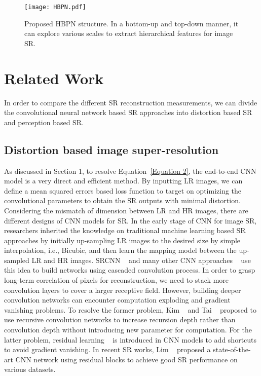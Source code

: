 \documentclass[10pt,twocolumn,letterpaper]{article}
\begin{document}
\begin{figure*}[h]
\vskip 0.01in
\begin{center}
\centerline{\texttt{[image: HBPN.pdf]}}
\caption{Proposed HBPN structure. In a bottom-up and top-down manner, it can explore various scales to extract hierarchical features for image SR.}
\label{Figure 1}
\end{center}
\vskip -0.3in
\end{figure*}


\section{Related Work}

In order to compare the different SR reconstruction measurements, we can divide the convolutional neural network based SR approaches into distortion based SR and perception based SR.

\subsection{Distortion based image super-resolution}

As discussed in Section 1, to resolve Equation~\ref{Equation 2}, the end-to-end CNN model is a very direct and efficient method. By inputting LR images, we can define a mean squared errors based loss function to target on optimizing the convolutional parameters to obtain the SR outputs with minimal distortion. Considering the mismatch of dimension between LR and HR images, there are different designs of CNN models for SR. In the early stage of CNN for image SR, researchers inherited the knowledge on traditional machine learning based SR approaches by initially up-sampling LR images to the desired size by simple interpolation, i.e., Bicubic, and then learn the mapping model between the up-sampled LR and HR images. SRCNN ~\cite{SRCNN} and many other CNN approaches ~\cite{VDSR,DRRN,LapSRN,EDSR,DBPN} use this idea to build networks using cascaded convolution process. In order to grasp long-term correlation of pixels for reconstruction, we need to stack more convolution layers to cover a larger receptive field. However, building deeper convolution networks can encounter computation exploding and gradient vanishing problems. To resolve the former problem, Kim \etal ~\cite{DRCN} and Tai \etal ~\cite{DRRN} proposed to use recursive convolution networks to increase recursion depth rather than convolution depth without introducing new parameter for computation. For the latter problem, residual learning ~\cite{ResNet} is introduced in CNN models to add shortcuts to avoid gradient vanishing. In recent SR works, Lim \etal ~\cite{EDSR} proposed a state-of-the-art CNN network using residual blocks to achieve good SR performance on various datasets. 
\end{document}
